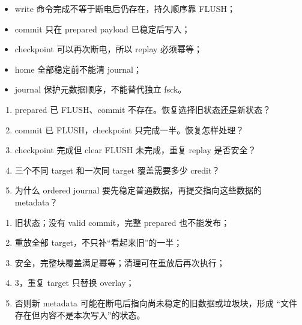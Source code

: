\begin{pitfallbox}
\begin{itemize}[leftmargin=2.2em]
  \item write 命令完成不等于断电后仍存在，持久顺序靠 FLUSH；
  \item commit 只在 prepared payload 已稳定后写入；
  \item checkpoint 可以再次断电，所以 replay 必须幂等；
  \item home 全部稳定前不能清 journal；
  \item journal 保护元数据顺序，不能替代独立 fsck。
\end{itemize}
\end{pitfallbox}


\begin{enumerate}[leftmargin=2.2em]
  \item prepared 已 FLUSH、commit 不存在。恢复选择旧状态还是新状态？
  \item commit 已 FLUSH，checkpoint 只完成一半。恢复怎样处理？
  \item checkpoint 完成但 clear FLUSH 未完成，重复 replay 是否安全？
  \item 三个不同 target 和一次同 target 覆盖需要多少 credit？
  \item 为什么 ordered journal 要先稳定普通数据，再提交指向这些数据的
    metadata？
\end{enumerate}

\begin{answerbox}
\begin{enumerate}[leftmargin=2.2em]
  \item 旧状态；没有 valid commit，完整 prepared 也不能发布；
  \item 重放全部 target，不只补“看起来旧”的一半；
  \item 安全，完整块覆盖满足幂等；清理可在重放后再次执行；
  \item 3，重复 target 只替换 overlay；
  \item 否则新 metadata 可能在断电后指向尚未稳定的旧数据或垃圾块，形成
    “文件存在但内容不是本次写入”的状态。
\end{enumerate}
\end{answerbox}
